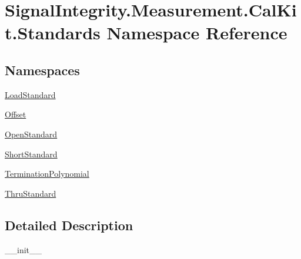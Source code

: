 \hypertarget{namespaceSignalIntegrity_1_1Measurement_1_1CalKit_1_1Standards}{}\section{Signal\+Integrity.\+Measurement.\+Cal\+Kit.\+Standards Namespace Reference}
\label{namespaceSignalIntegrity_1_1Measurement_1_1CalKit_1_1Standards}
\subsection*{Namespaces}
\begin{DoxyCompactItemize}
\item 
 \hyperlink{namespaceSignalIntegrity_1_1Measurement_1_1CalKit_1_1Standards_1_1LoadStandard}{Load\+Standard}
\item 
 \hyperlink{namespaceSignalIntegrity_1_1Measurement_1_1CalKit_1_1Standards_1_1Offset}{Offset}
\item 
 \hyperlink{namespaceSignalIntegrity_1_1Measurement_1_1CalKit_1_1Standards_1_1OpenStandard}{Open\+Standard}
\item 
 \hyperlink{namespaceSignalIntegrity_1_1Measurement_1_1CalKit_1_1Standards_1_1ShortStandard}{Short\+Standard}
\item 
 \hyperlink{namespaceSignalIntegrity_1_1Measurement_1_1CalKit_1_1Standards_1_1TerminationPolynomial}{Termination\+Polynomial}
\item 
 \hyperlink{namespaceSignalIntegrity_1_1Measurement_1_1CalKit_1_1Standards_1_1ThruStandard}{Thru\+Standard}
\end{DoxyCompactItemize}


\subsection{Detailed Description}
\begin{DoxyVerb}__init__\end{DoxyVerb}
 